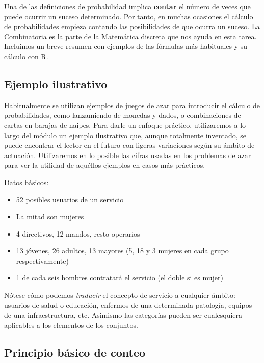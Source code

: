 \documentclass[
]{book}
\begin{document}
Una de las definiciones de probabilidad implica \textbf{contar}
el número de veces que puede ocurrir un suceso determinado. Por tanto,
en muchas ocasiones el cálculo de probabilidades empieza contando las
posibilidades de que ocurra un suceso. La Combinatoria es la parte de la
Matemática discreta que nos ayuda en esta tarea. Incluimos un breve
resumen con ejemplos de las fórmulas más habituales y su cálculo con R.

\hypertarget{ejemplo-ilustrativo}{%
\subsection{Ejemplo ilustrativo}\label{ejemplo-ilustrativo}}

Habitualmente se utilizan ejemplos de juegos de azar para introducir el
cálculo de probabilidades, como lanzamiendo de monedas y dados, o
combinaciones de cartas en barajas de naipes. Para darle un enfoque
práctico, utilizaremos a lo largo del módulo un ejemplo ilustrativo que,
aunque totalmente inventado, se puede encontrar el lector
en el futuro con ligeras variaciones según su ámbito de actuación.
Utilizaremos en lo posible las cifras usadas en los problemas de azar
para ver la utilidad de aquéllos ejemplos en casos más prácticos.

Datos básicos:

\begin{itemize}
\item
  52 posibles usuarios de un servicio
\item
  La mitad son mujeres
\item
  4 directivos, 12 mandos, resto operarios
\item
  13 jóvenes, 26 adultos, 13 mayores (5, 18 y 3 mujeres en cada
  grupo respectivamente)
\item
  1 de cada seis hombres contratará el servicio (el doble si es mujer)
\end{itemize}

Nótese cómo podemos \emph{traducir} el concepto de
servicio a cualquier ámbito: usuarios de salud o educación, enfermos de
una determinada patología, equipos de una infraestructura, etc. Asimismo
las categorías pueden ser cualesquiera aplicables a los elementos de los
conjuntos.

\hypertarget{principio-buxe1sico-de-conteo}{%
\subsection{Principio básico de conteo}\label{principio-buxe1sico-de-conteo}}
\end{document}
